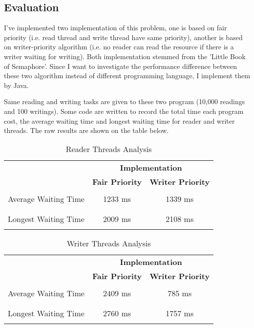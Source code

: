 \documentclass[a4paper,10pt]{article}
\begin{document}
\subsection{Evaluation}
I've implemented two implementation of this problem, one is based on fair priority (i.e. read thread and write thread have same priority), another is based on writer-priority algorithm (i.e. no reader can read the resource if there is a writer waiting for writing). Both implementation stemmed from the 'Little Book of Semaphore'. Since I want to investigate the performance difference between these two algorithm instead of different programming language, I implement them by Java.

Same reading and writing tasks are given to these two program (10,000 readings and 100 writings). Some code are written to record the total time each program cost, the average waiting time and longest waiting time for reader and writer threads. The raw results are shown on the table below.

\begin{table}[h]
\centering
\begin{tabular}{ |l|c|c| }
\hline
 \multirow{2}{*}{}&\multicolumn{2}{c|}{\textbf{Implementation}} \\ \cline{2-3}
 & \textbf{Fair Priority} & \textbf{Writer Priority} \\ \hline
\multirow{3}{*}{Average Waiting Time}
 & & \\
 & 1233 ms & 1339 ms \\
  & & \\

\hline
\multirow{3}{*}{Longest Waiting Time}
 & & \\
 & 2009 ms & 2108 ms \\
  & & \\
 \hline

\end{tabular}
\caption{Reader Threads Analysis}
\end{table}


\begin{table}[h]
\centering
\begin{tabular}{ |l|c|c| }
\hline
 \multirow{2}{*}{}&\multicolumn{2}{c|}{\textbf{Implementation}} \\ \cline{2-3}
 & \textbf{Fair Priority} & \textbf{Writer Priority} \\ \hline
\multirow{3}{*}{Average Waiting Time}
 & & \\
 & 2409 ms & 785 ms \\
  & & \\

\hline
\multirow{3}{*}{Longest Waiting Time}
 & & \\
 & 2760 ms & 1757 ms \\
  & & \\
 \hline

\end{tabular}
\caption{Writer Threads Analysis}
\end{table}
\end{document}
